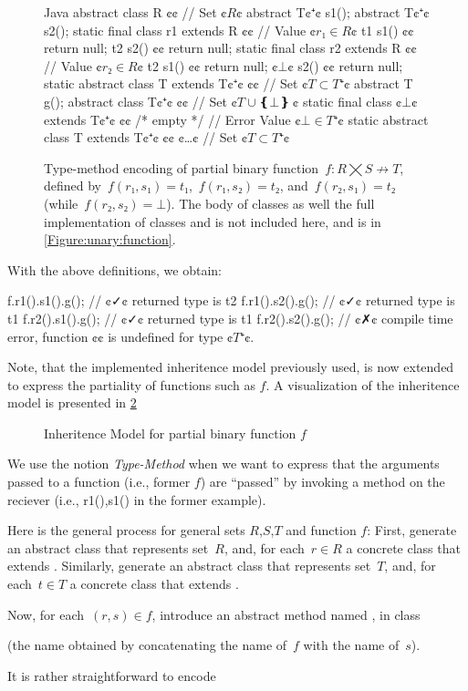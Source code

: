 \begin{figure}[hbt]
  \begin{Code}{Java}
abstract class R {¢¢ // Set ¢$R$¢
  abstract T¢$⁺$¢ s1();
  abstract T¢$⁺$¢ s2();
  static final class r1 extends R {¢¢ // Value ¢$r₁∈R$¢
    t1 s1() {¢¢ return null; }
    t2 s2() {¢¢ return null; }
  }
  static final class r2 extends R {¢¢ // Value ¢$r₂∈R$¢
    t2 s1() {¢¢ return null; }
    ¢$⊥$¢ s2() {¢¢ return null; }
  }
  static abstract class T extends T¢$⁺$¢ {¢¢ // Set ¢$T⊂T⁺$¢
    abstract T g();
  }
  abstract class T¢$⁺$¢ {¢¢ // Set ¢$T∪❴⊥❵~$¢
    static final class ¢$⊥$¢ extends T¢$⁺$¢ {¢¢ /* empty */ } // Error Value ¢$⊥∈T⁺$¢
    static abstract class T extends T¢$⁺$¢ {¢¢ ¢…¢ } // Set ¢$T⊂T⁺$¢
  }
}
\end{Code}
  \caption{Type-method encoding of partial binary function~$f: R⨉S↛T$,
  defined by~$f(r₁,s₁)=t₁$,~$f(r₁,s₂)=t₂$, and~$f(r₂,s₁)=t₂$ (while~$f(r₂, s₂) =⊥$).
  The body of classes  as well the full implementation of classes  and  is not included here, and is
    in \cref{Figure:unary:function}.}
  \label{Figure:simple:binary}
\end{figure}

With the above definitions, we obtain:
\begin{JAVA}
f.r1().s1().g(); // ¢✓¢ returned type is t2
f.r1().s2().g(); // ¢✓¢ returned type is t1
f.r2().s1().g(); // ¢✓¢ returned type is t1
f.r2().s2().g(); // ¢✗¢ compile time error, function ¢¢ is undefined for type ¢$T⁺$¢.
\end{JAVA}

Note, that the implemented inheritence model previously used, is now extended to express the partiality
  of functions such as $f$. A visualization of the inheritence model is presented in \cref{Figure:partial:inheritence:model}

\begin{figure}[ht]
  \label{Figure:partial:inheritence:model}
  \caption{Inheritence Model for partial binary function $f$}
  \begin{adjustbox}{max width=0.6\linewidth}
    
  \end{adjustbox}
\end{figure}

We use the notion \emph{Type-Method} when we want to express that the arguments passed to a function 
  (i.e., former $f$) are ``passed'' by invoking a method on the reciever (i.e., r1(),s1() in the former example).

Here is the general process for general sets $R$,$S$,$T$ and function $f$:
First, generate an abstract class  that represents set~$R$, and,
  for each~$r∈R$ a concrete class  that extends .
Similarly, generate an abstract class  that represents set~$T$, and,
  for each~$t∈T$ a concrete class  that extends .

Now, for each~$(r,s)∈f$, introduce an abstract method named ,
  in class~

(the name obtained by
  concatenating the name of~$f$ with the name of~$s$).

It is rather straightforward to encode
